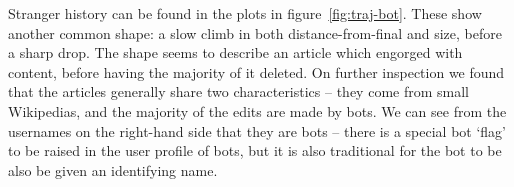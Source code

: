Stranger history can be found in the plots in
figure~\ref{fig:traj-bot}. These show another common shape: a slow
climb in both distance-from-final and size, before a sharp drop. The
shape seems to describe an article which engorged with content, before
having the majority of it deleted. On further inspection we found that
the articles generally share two characteristics -- they come from
small Wikipedias, and the majority of the edits are made by bots. We
can see from the usernames on the right-hand side that they are bots
-- there is a special bot `flag' to be raised in the user profile of
bots, but it is also traditional for the bot to be also be given an
identifying name.\cite{wiki-bot-policy}
 
\begin{figure}
  \centering
  \\
  \vspace{5mm}
\end{figure}
